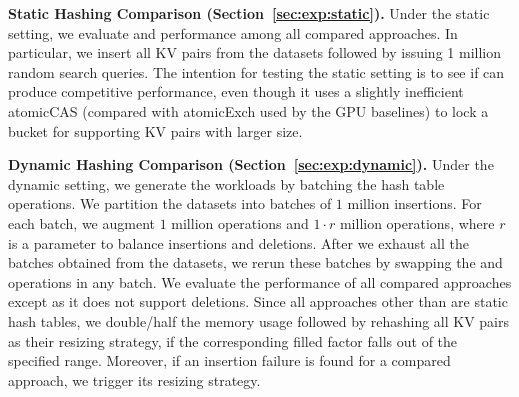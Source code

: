 \vspace{1mm}\noindent\textbf{Static Hashing Comparison (Section~\ref{sec:exp:static}).}
Under the static setting, we evaluate  and  performance among all compared approaches. 
In particular, we insert all KV pairs from the datasets followed by issuing 1 million random search queries. 
The intention for testing the static setting is to see if \voter can produce competitive performance, even though it uses a slightly inefficient atomicCAS (compared with atomicExch used by the GPU baselines) to lock a bucket for supporting KV pairs with larger size.  

\vspace{1mm}\noindent\textbf{Dynamic Hashing Comparison (Section~\ref{sec:exp:dynamic}).}
Under the dynamic setting, we generate the workloads by batching the hash table operations. 
We partition the datasets into batches of $1$ million insertions. 
For each batch, we augment $1$ million  operations and $1 \cdot r$ million  operations,
where $r$ is a parameter to balance insertions and deletions.
After we exhaust all the batches obtained from the datasets, we rerun these batches by swapping the  and  operations in any batch. 
We evaluate the performance of all compared approaches except \cudpp as it does not support deletions. 
Since all approaches other than \voter are static hash tables, we double/half the memory usage followed by rehashing all KV pairs as their resizing strategy, if the corresponding filled factor falls out of the specified range. 
Moreover, if an insertion failure is found for a compared approach, we trigger its resizing strategy.

